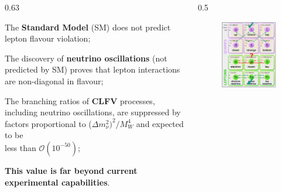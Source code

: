 \documentclass{beamer}
\begin{document}
\begin{frame}
\begin{columns}
\begin{column}{0.63\framewidth}
        \begin{itemize}
     {\footnotesize     \item The \textbf{Standard Model} (SM) does not predict lepton flavour violation; \textcolor{white}{\cite{Bernstein_2013} \cite{Kargiantoulakis_2020} \cite{universe9010054}}
            \vspace{7mm}
            \item The discovery of \textbf{neutrino oscillations} (not predicted by SM) proves that lepton interactions are non-diagonal in flavour; 
            \vspace{7mm}
            \item The branching ratios of \textbf{CLFV}
            processes, including neutrino
            oscillations, are suppressed by factors
            proportional to ($\Delta m_\nu^2)^2 /M^4_W$ and expected to be \\ less than $\mathcal{O}(10^{-50})$;
            \vspace{7mm}
            \item \textbf{This value is far beyond current experimental capabilities}.}  
        \end{itemize}
    \end{column}
    \begin{column}{0.5\framewidth}
        \begin{figure}[h]
            \centering
            \includegraphics[width=0.7\columnwidth]{figures/png/Screenshot_20240913_102556.png}
        \end{figure} 
        

\end{column}
\end{columns}
\end{frame}
\end{document}
